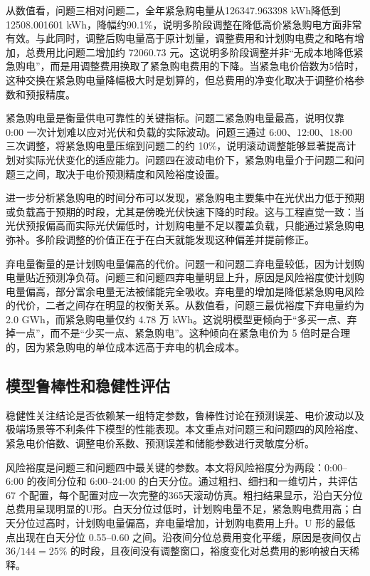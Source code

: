 \documentclass[UTF8]{ctexart}
\begin{document}
    从数值看，问题三相对问题二，全年紧急购电量从126347.963398 kWh降低到12508.001601 kWh，降幅约90.1\%，说明多阶段调整在降低高价紧急购电方面非常有效。与此同时，调整后购电量高于原计划量，调整费用和计划购电费之和略有增加，总费用比问题二增加约 72060.73 元。这说明多阶段调整并非“无成本地降低紧急购电”，而是用调整费用换取了紧急购电费用的下降。当紧急电价倍数为5倍时，这种交换在紧急购电量降幅极大时是划算的，但总费用的净变化取决于调整价格参数和预报精度。\par
    
    紧急购电量是衡量供电可靠性的关键指标。问题二紧急购电量最高，说明仅靠 0:00 一次计划难以应对光伏和负载的实际波动。问题三通过 6:00、12:00、18:00 三次调整，将紧急购电量压缩到问题二的约 10\%，说明滚动调整能够显著提高计划对实际光伏变化的适应能力。问题四在波动电价下，紧急购电量介于问题二和问题三之间，取决于电价预测精度和风险裕度设置。\par
    
    进一步分析紧急购电的时间分布可以发现，紧急购电主要集中在光伏出力低于预期或负载高于预期的时段，尤其是傍晚光伏快速下降的时段。这与工程直觉一致：当光伏预报偏高而实际光伏偏低时，计划购电量不足以覆盖负载，只能通过紧急购电弥补。多阶段调整的价值正在于在白天就能发现这种偏差并提前修正。\par
    
    弃电量衡量的是计划购电量偏高的代价。问题一和问题二弃电量较低，因为计划购电量贴近预测净负荷。问题三和问题四弃电量明显上升，原因是风险裕度使计划购电量偏高，部分富余电量无法被储能完全吸收。弃电量的增加是降低紧急购电风险的代价，二者之间存在明显的权衡关系。从数值看，问题三最优裕度下弃电量约为 2.0 GWh，而紧急购电量仅约 4.78 万 kWh。这说明模型更倾向于“多买一点、弃掉一点”，而不是“少买一点、紧急购电”。这种倾向在紧急电价为 5 倍时是合理的，因为紧急购电的单位成本远高于弃电的机会成本。\par
    
    \subsection{模型鲁棒性和稳健性评估}
    
    稳健性关注结论是否依赖某一组特定参数，鲁棒性讨论在预测误差、电价波动以及极端场景等不利条件下模型的性能表现。本文重点对问题三和问题四的风险裕度、紧急电价倍数、调整电价系数、预测误差和储能参数进行灵敏度分析。\par
    
    风险裕度是问题三和问题四中最关键的参数。本文将风险裕度分为两段：0:00–6:00 的夜间分位和 6:00–24:00 的白天分位。通过粗扫、细扫和一维切片，共评估 67 个配置，每个配置对应一次完整的365天滚动仿真。粗扫结果显示，沿白天分位总费用呈现明显的U形。白天分位过低时，计划购电量不足，紧急购电费用高；白天分位过高时，计划购电量偏高，弃电量增加，计划购电费用上升。U 形的最低点出现在白天分位 0.55–0.60 之间。沿夜间分位总费用变化平缓，原因是夜间仅占 $36/144 = 25\%$ 的时段，且夜间没有调整窗口，裕度变化对总费用的影响被白天稀释。\par
    
\end{document}
